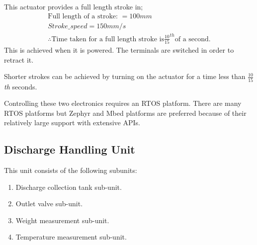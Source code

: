 \begin{enumerate}
\begin{itemize}
        \par
        This actuator provides a full length stroke in;
        \begin{align*}
            \text{Full length of a stroke: } = 100mm\\
            Stroke\_speed = 150mm/s\\
            \therefore \text{Time taken for a full length stroke is} \frac{10}{15}^{th}  \text{of a second.}
        \end{align*}
        This is achieved when it is powered. The terminals are switched in order to retract it.
        \par
        Shorter strokes can be achieved by turning on the actuator for a time less than $\frac{10}{15}$ \textit{th} seconds.
    \end{itemize}
\end{enumerate}
Controlling these two electronics requires an RTOS platform. There are many RTOS platforms but Zephyr and Mbed platforms are preferred because of their relatively large support with extensive APIs. 
\clearpage
\subsection{Discharge Handling Unit}
This unit consists of the following subunits:
\begin{enumerate}
    \item Discharge collection tank sub-unit.
    \item Outlet valve sub-unit.
    \item Weight measurement sub-unit.
    \item Temperature measurement sub-unit.
\end{enumerate}

